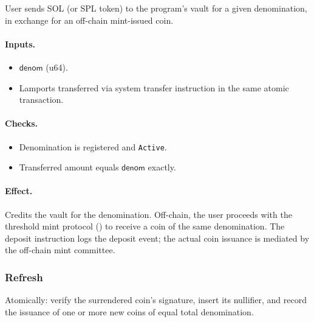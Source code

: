 User sends SOL (or SPL token) to the program's vault for a given denomination, in exchange for an off-chain mint-issued coin.

\paragraph{Inputs.}
\begin{itemize}[leftmargin=2em,itemsep=0pt]
  \item $\mathsf{denom}$ (u64).
  \item Lamports transferred via system transfer instruction in the same atomic transaction.
\end{itemize}

\paragraph{Checks.}
\begin{itemize}[leftmargin=2em,itemsep=0pt]
  \item Denomination is registered and \texttt{Active}.
  \item Transferred amount equals $\mathsf{denom}$ exactly.
\end{itemize}

\paragraph{Effect.} Credits the vault for the denomination. Off-chain, the user proceeds with the threshold mint protocol () to receive a coin of the same denomination. The deposit instruction logs the deposit event; the actual coin issuance is mediated by the off-chain mint committee.

\subsubsection{Refresh}
\label{sec:onchain-instr-refresh}

Atomically: verify the surrendered coin's signature, insert its nullifier, and record the issuance of one or more new coins of equal total denomination.

